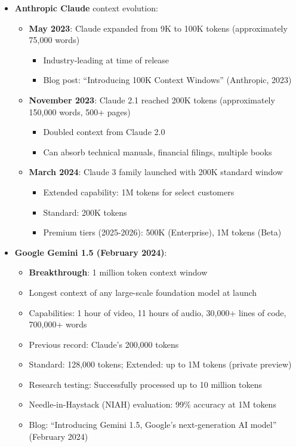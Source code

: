 \documentclass[11pt,letterpaper]{article}
\begin{document}
\begin{itemize}[leftmargin=*]
    \item \textbf{Anthropic Claude} context evolution:
    \begin{itemize}
        \item \textbf{May 2023}: Claude expanded from 9K to 100K tokens (approximately 75,000 words)
        \begin{itemize}
            \item Industry-leading at time of release
            \item Blog post: ``Introducing 100K Context Windows'' (Anthropic, 2023)
        \end{itemize}
        \item \textbf{November 2023}: Claude 2.1 reached 200K tokens (approximately 150,000 words, 500+ pages)
        \begin{itemize}
            \item Doubled context from Claude 2.0
            \item Can absorb technical manuals, financial filings, multiple books
        \end{itemize}
        \item \textbf{March 2024}: Claude 3 family launched with 200K standard window
        \begin{itemize}
            \item Extended capability: 1M tokens for select customers
            \item Standard: 200K tokens
            \item Premium tiers (2025-2026): 500K (Enterprise), 1M tokens (Beta)
        \end{itemize}
    \end{itemize}

    \item \textbf{Google Gemini 1.5 (February 2024)}:
    \begin{itemize}
        \item \textbf{Breakthrough}: 1 million token context window
        \item Longest context of any large-scale foundation model at launch
        \item Capabilities: 1 hour of video, 11 hours of audio, 30,000+ lines of code, 700,000+ words
        \item Previous record: Claude's 200,000 tokens
        \item Standard: 128,000 tokens; Extended: up to 1M tokens (private preview)
        \item Research testing: Successfully processed up to 10 million tokens
        \item Needle-in-Haystack (NIAH) evaluation: 99\% accuracy at 1M tokens
        \item Blog: ``Introducing Gemini 1.5, Google's next-generation AI model'' (February 2024)
    \end{itemize}
\end{itemize}
\end{document}
